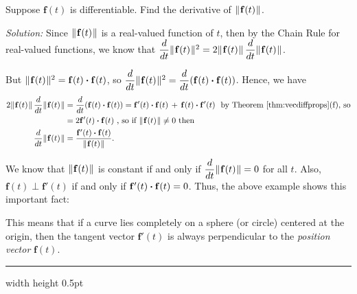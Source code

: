 \begin{exmp}\label{exmp:absvecderiv}
 Suppose $\mathbf{f}(t)$ is differentiable. Find the derivative of $\lVert\mspace{1mu}\mathbf{f}(t)\mspace{1mu}\rVert$.
 \smallskip
 \par\noindent \emph{Solution:} Since $\lVert\mspace{1mu}\mathbf{f}(t)\mspace{1mu}\rVert$ is a real-valued function of $t$, then by the Chain
 Rule for real-valued functions, we know that
  $\dfrac{d}{dt} \lVert\mspace{1mu}\mathbf{f}(t)\mspace{1mu}\rVert^2 = 2 \lVert\mspace{1mu}\mathbf{f}(t)\mspace{1mu}\rVert \, \dfrac{d}{dt} \lVert\mspace{1mu}\mathbf{f}(t)\mspace{1mu}\rVert$.

 \par\noindent But $\lVert\mspace{1mu}\mathbf{f}(t)\mspace{1mu}\rVert^2 = \mathbf{f}(t) \bm{\cdot} \mathbf{f}(t)$, so
 $\dfrac{d}{dt} \lVert\mspace{1mu}\mathbf{f}(t)\mspace{1mu}\rVert^2 = \dfrac{d}{dt} ( \mathbf{f}(t) \bm{\cdot} \mathbf{f}(t) )$.
 Hence, we have
 \begin{align*}
  2 \lVert\mspace{1mu}\mathbf{f}(t)\mspace{1mu}\rVert\,\dfrac{d}{dt} \lVert\mspace{1mu}\mathbf{f}(t)\mspace{1mu}\rVert &= \dfrac{d}{dt} (\mathbf{f}(t) \bm{\cdot} \mathbf{f}(t))
  = \mathbf{f}'(t) \bm{\cdot} \mathbf{f}(t) \, + \, \mathbf{f}(t) \bm{\cdot} \mathbf{f}'(t)
   \text{~~by Theorem \ref{thm:vecdiffprops}(f), so}\\
  &= 2 \mathbf{f}'(t) \bm{\cdot} \mathbf{f}(t) \text{~,~so if $\lVert\mspace{1mu}\mathbf{f}(t)\mspace{1mu}\rVert \ne 0$ then}\\
  \dfrac{d}{dt} \lVert\mspace{1mu}\mathbf{f}(t)\mspace{1mu}\rVert &= \dfrac{\mathbf{f}'(t) \bm{\cdot} \mathbf{f}(t)}{\lVert\mspace{1mu}\mathbf{f}(t)\mspace{1mu}\rVert} .
 \end{align*}

We know that $\lVert\mspace{1mu}\mathbf{f}(t)\mspace{1mu}\rVert$ is constant if and only if $\dfrac{d}{dt} \lVert\mspace{1mu}\mathbf{f}(t)\mspace{1mu}\rVert = 0$ for all $t$.
Also, $\mathbf{f}(t) \perp \mathbf{f}'(t)$ if and only if $\mathbf{f}'(t) \bm{\cdot} \mathbf{f}(t) = 0$. Thus, the
above example shows this important fact:
\begin{center}\end{center}
This means that if a curve lies completely on a sphere (or circle) centered at the origin, then the tangent vector
$\mathbf{f}'(t)$ is always perpendicular to the \emph{position vector} $\mathbf{f}(t)$.
\end{exmp}
\hrule width \textwidth height 0.5pt
